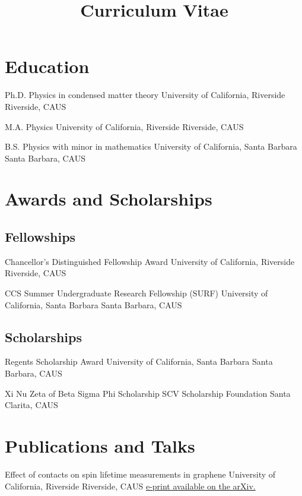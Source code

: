 \documentclass[10pt,letter]{moderncv}
\title{Curriculum Vitae}
\begin{document}
  \maketitle

  \section{Education}

    {Ph.D. Physics in condensed matter theory}
    {University of California, Riverside}
    {Riverside, CA}{US}{}

    {M.A. Physics}
    {University of California, Riverside}
    {Riverside, CA}{US}{}

    {B.S. Physics with minor in mathematics}
    {University of California, Santa Barbara}
    {Santa Barbara, CA}{US}{}

  \section{Awards and Scholarships}

  \subsection{Fellowships}

    {Chancellor's Distinguished Fellowship Award}
    {University of California, Riverside}
    {Riverside, CA}{US}{}

    {CCS Summer Undergraduate Research Fellowship (SURF)}
    {University of California, Santa Barbara}
    {Santa Barbara, CA}{US}{}

  \subsection{Scholarships}

    {Regents Scholarship Award}
    {University of California, Santa Barbara}
    {Santa Barbara, CA}{US}{}

    {Xi Nu Zeta of Beta Sigma Phi Scholarship}
    {SCV Scholarship Foundation}
    {Santa Clarita, CA}{US}{}

  \section{Publications and Talks}

    {Effect of contacts on spin lifetime measurements in graphene}
    {University of California, Riverside}
    {Riverside, CA}{US}
    {\href{http://arxiv.org/abs/1404.3211}
      {e-print available on the arXiv.}}
\end{document}
